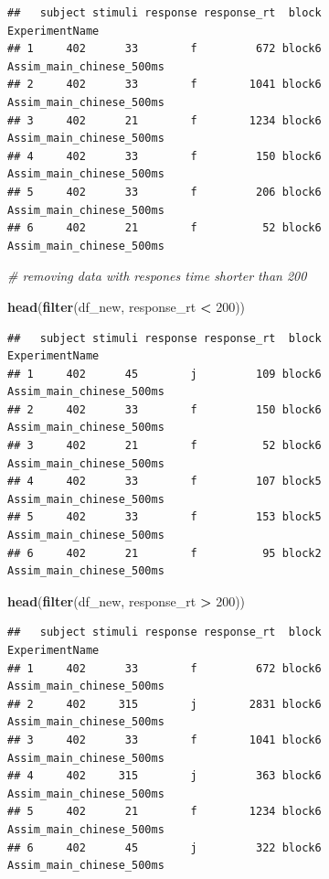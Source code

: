 \documentclass[]{book}
\newenvironment{Shaded}{\begin{snugshade}}{\end{snugshade}}
\newcommand{\KeywordTok}[1]{\textcolor[rgb]{0.13,0.29,0.53}{\textbf{#1}}}
\newcommand{\DecValTok}[1]{\textcolor[rgb]{0.00,0.00,0.81}{#1}}
\newcommand{\StringTok}[1]{\textcolor[rgb]{0.31,0.60,0.02}{#1}}
\newcommand{\CommentTok}[1]{\textcolor[rgb]{0.56,0.35,0.01}{\textit{#1}}}
\newcommand{\OperatorTok}[1]{\textcolor[rgb]{0.81,0.36,0.00}{\textbf{#1}}}
\newcommand{\NormalTok}[1]{#1}
\begin{document}
\begin{verbatim}
##   subject stimuli response response_rt  block           ExperimentName
## 1     402      33        f         672 block6 Assim_main_chinese_500ms
## 2     402      33        f        1041 block6 Assim_main_chinese_500ms
## 3     402      21        f        1234 block6 Assim_main_chinese_500ms
## 4     402      33        f         150 block6 Assim_main_chinese_500ms
## 5     402      33        f         206 block6 Assim_main_chinese_500ms
## 6     402      21        f          52 block6 Assim_main_chinese_500ms
\end{verbatim}

\begin{Shaded}
\begin{Highlighting}[]
\CommentTok{# removing data with respones time shorter than 200}

\KeywordTok{head}\NormalTok{(}\KeywordTok{filter}\NormalTok{(df_new, response_rt }\OperatorTok{<}\StringTok{ }\DecValTok{200}\NormalTok{))}
\end{Highlighting}
\end{Shaded}

\begin{verbatim}
##   subject stimuli response response_rt  block           ExperimentName
## 1     402      45        j         109 block6 Assim_main_chinese_500ms
## 2     402      33        f         150 block6 Assim_main_chinese_500ms
## 3     402      21        f          52 block6 Assim_main_chinese_500ms
## 4     402      33        f         107 block5 Assim_main_chinese_500ms
## 5     402      33        f         153 block5 Assim_main_chinese_500ms
## 6     402      21        f          95 block2 Assim_main_chinese_500ms
\end{verbatim}

\begin{Shaded}
\begin{Highlighting}[]
\KeywordTok{head}\NormalTok{(}\KeywordTok{filter}\NormalTok{(df_new, response_rt }\OperatorTok{>}\StringTok{ }\DecValTok{200}\NormalTok{))}
\end{Highlighting}
\end{Shaded}

\begin{verbatim}
##   subject stimuli response response_rt  block           ExperimentName
## 1     402      33        f         672 block6 Assim_main_chinese_500ms
## 2     402     315        j        2831 block6 Assim_main_chinese_500ms
## 3     402      33        f        1041 block6 Assim_main_chinese_500ms
## 4     402     315        j         363 block6 Assim_main_chinese_500ms
## 5     402      21        f        1234 block6 Assim_main_chinese_500ms
## 6     402      45        j         322 block6 Assim_main_chinese_500ms
\end{verbatim}
\end{document}
